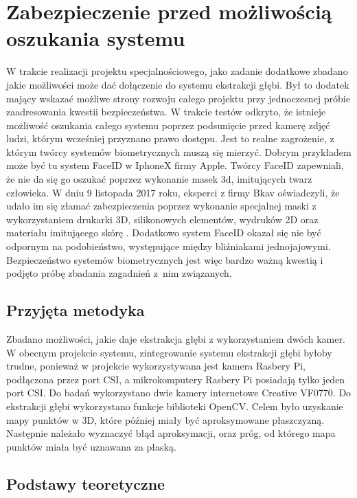 \documentclass[oneside, eng]{mgr}
\begin{document}
\newpage

\chapter{Zabezpieczenie przed możliwością oszukania systemu}

W trakcie realizacji projektu specjalnościowego, jako zadanie dodatkowe zbadano jakie możliwości może dać dołączenie do systemu ekstrakcji głębi. Był to dodatek mający wskazać możliwe strony rozwoju całego projektu przy jednoczesnej próbie zaadresowania kwestii bezpieczeństwa. W trakcie testów odkryto, że istnieje możliwość oszukania całego systemu poprzez podsunięcie przed kamerę zdjęć ludzi, którym wcześniej przyznano prawo dostępu. Jest to realne zagrożenie, z którym twórcy systemów biometrycznych muszą się mierzyć. Dobrym przykładem może być tu system FaceID w IphoneX firmy Apple. Twórcy FaceID zapewniali, że nie da się go oszukać poprzez wykonanie masek 3d, imitujących twarz człowieka. W dniu 9 listopada 2017 roku, eksperci z firmy Bkav oświadczyli, że udało im się złamać zabezpieczenia poprzez wykonanie specjalnej maski z wykorzystaniem drukarki 3D, silikonowych elementów, wydruków 2D oraz materiału imitującego skórę \cite{FaceID hacked}. Dodatkowo system FaceID okazał się nie być odpornym na podobieństwo, występujące między bliźniakami jednojajowymi. Bezpieczeństwo systemów biometrycznych jest więc bardzo ważną kwestią i podjęto próbę zbadania zagadnień z~nim związanych.

\section{Przyjęta metodyka}
Zbadano możliwości, jakie daje ekstrakcja głębi z wykorzystaniem dwóch kamer. W obecnym projekcie systemu, zintegrowanie systemu ekstrakcji głębi byłoby trudne, ponieważ w projekcie wykorzystywana jest kamera Rasbery Pi, podłączona przez port CSI, a mikrokomputery Rasbery Pi posiadają tylko jeden port CSI. Do badań wykorzystano dwie kamery internetowe Creative VF0770. Do ekstrakcji głębi wykorzystano funkcje biblioteki OpenCV. Celem było uzyskanie mapy punktów w 3D, które później miały być aproksymowane płaszczyzną. Następnie należało wyznaczyć błąd aproksymacji, oraz próg, od którego mapa punktów miała być uznawana za płaską.

\section{Podstawy teoretyczne}
\end{document}
